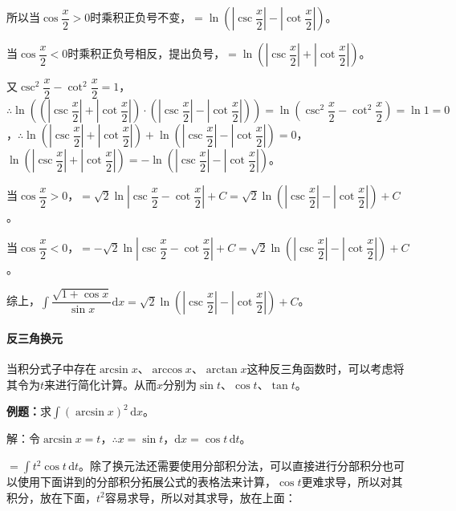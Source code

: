\documentclass[UTF8, 12pt]{ctexart}
\begin{document}
所以当$\cos\dfrac{x}{2}>0$时乘积正负号不变，$=\ln\left(\left\vert\csc\dfrac{x}{2}\right\vert-\left\vert\cot\dfrac{x}{2}\right\vert\right)$。

当$\cos\dfrac{x}{2}<0$时乘积正负号相反，提出负号，$=\ln\left(\left\vert\csc\dfrac{x}{2}\right\vert+\left\vert\cot\dfrac{x}{2}\right\vert\right)$。

又$\csc^2\dfrac{x}{2}-\cot^2\dfrac{x}{2}=1$，$\therefore\ln\left(\left(\left\vert\csc\dfrac{x}{2}\right\vert+\left\vert\cot\dfrac{x}{2}\right\vert\right)\cdot\left(\left\vert\csc\dfrac{x}{2}\right\vert-\left\vert\cot\dfrac{x}{2}\right\vert\right)\right)=\ln\left(\csc^2\dfrac{x}{2}-\cot^2\dfrac{x}{2}\right)=\ln1=0$，$\therefore\ln\left(\left\vert\csc\dfrac{x}{2}\right\vert+\left\vert\cot\dfrac{x}{2}\right\vert\right)+\ln\left(\left\vert\csc\dfrac{x}{2}\right\vert-\left\vert\cot\dfrac{x}{2}\right\vert\right)=0$，$\ln\left(\left\vert\csc\dfrac{x}{2}\right\vert+\left\vert\cot\dfrac{x}{2}\right\vert\right)=-\ln\left(\left\vert\csc\dfrac{x}{2}\right\vert-\left\vert\cot\dfrac{x}{2}\right\vert\right)$。

当$\cos\dfrac{x}{2}>0$，$=\sqrt{2}\ln\left\vert\csc\dfrac{x}{2}-\cot\dfrac{x}{2}\right\vert+C=\sqrt{2}\ln\left(\left\vert\csc\dfrac{x}{2}\right\vert-\left\vert\cot\dfrac{x}{2}\right\vert\right)+C$。

当$\cos\dfrac{x}{2}<0$，$=-\sqrt{2}\ln\left\vert\csc\dfrac{x}{2}-\cot\dfrac{x}{2}\right\vert+C=\sqrt{2}\ln\left(\left\vert\csc\dfrac{x}{2}\right\vert-\left\vert\cot\dfrac{x}{2}\right\vert\right)+C$。

综上，$\displaystyle{\int\dfrac{\sqrt{1+\cos x}}{\sin x}\textrm{d}x}=\sqrt{2}\ln\left(\left\vert\csc\dfrac{x}{2}\right\vert-\left\vert\cot\dfrac{x}{2}\right\vert\right)+C$。

\paragraph{反三角换元} \leavevmode \medskip

当积分式子中存在$\arcsin x$、$\arccos x$、$\arctan x$这种反三角函数时，可以考虑将其令为$t$来进行简化计算。从而$x$分别为$\sin t$、$\cos t$、$\tan t$。

\textbf{例题：}求$\int(\arcsin x)^2\,\textrm{d}x$。

解：令$\arcsin x=t$，$\therefore x=\sin t$，$\textrm{d}x=\cos t\,\textrm{d}t$。

$=\int t^2\cos t\,\textrm{d}t$。除了换元法还需要使用分部积分法，可以直接进行分部积分也可以使用下面讲到的分部积分拓展公式的表格法来计算，$\cos t$更难求导，所以对其积分，放在下面，$t^2$容易求导，所以对其求导，放在上面：\medskip
\end{document}
